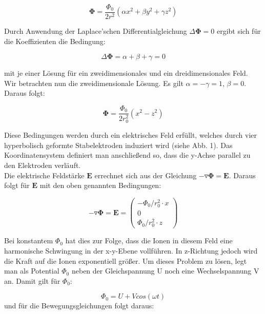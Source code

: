 \begin{equation}
\mathbf{\Phi} = \frac{\Phi_{0}}{2r^{2}}\left(\alpha x^{2}+\beta y^{2}+\gamma z^{2}\right)
\end{equation}

Durch Anwendung der Laplace'schen Differentialgleichung $\Delta \mathbf{\Phi} =0$ ergibt sich für die Koeffizienten die Bedingung:

\begin{equation}
\Delta \mathbf{\Phi} = \alpha + \beta +\gamma =0
\end{equation}

mit je einer Lösung für ein zweidimensionales und ein dreidimensionales Feld.\\
Wir betrachten nun die zweidimensionale Lösung. Es gilt $\alpha = -\gamma = 1$, $\beta =0$. Daraus folgt:

\begin{equation}
\mathbf{\Phi} = \frac{\Phi_{0}}{2r_{0}^{2}}\left(x^{2}-z^{2}\right)
\end{equation}

Diese Bedingungen werden durch ein elektrisches Feld erfüllt, welches durch vier hyperbolisch geformte Stabelektroden induziert wird (siehe Abb. 1). Das Koordinatensystem definiert man anschließend so, dass die y-Achse parallel zu den Elektroden verläuft.
\\
Die elektrische Feldstärke $\mathbf{E}$ errechnet sich aus der Gleichung $-\mathbf{\triangledown \Phi} = \mathbf{E}$. Daraus folgt für $\mathbf{E}$ mit den oben genannten Bedingungen:

\begin{equation}
-\mathbf{\triangledown \Phi} = \mathbf{E} =
\left(
\begin{matrix}
-\Phi_{0}/r_{0}^{2} \cdot x\\
0\\
\Phi_{0}/r_{0}^{2} \cdot z
\end{matrix}
\right)
\end{equation}

Bei konstantem $\Phi_{0}$ hat dies zur Folge, dass die Ionen in diesem Feld eine harmonische Schwingung in der x-y-Ebene vollführen. In z-Richtung jedoch wird die Kraft auf die Ionen exponentiell größer. Um dieses Problem zu lösen, legt man als Potential $\Phi_{0}$ neben der Gleichspannung U noch eine Wechselspannung V an. Damit gilt für $\Phi_{0}$:

\begin{equation}
\Phi_{0}=U + V cos(\omega t)
\end{equation}
\newpage
und für die Bewegungsgleichungen folgt daraus:

